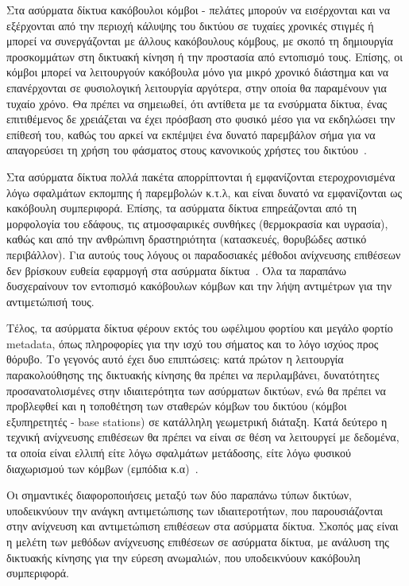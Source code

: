 \documentclass[12pt]{report}
\begin{document}
Στα ασύρματα δίκτυα κακόβουλοι κόμβοι - πελάτες μπορούν να εισέρχονται και να εξέρχονται από την περιοχή κάλυψης του δικτύου σε τυχαίες χρονικές στιγμές ή μπορεί να συνεργάζονται με άλλους κακόβουλους κόμβους, με σκοπό τη δημιουργία προσκομμάτων στη δικτυακή κίνηση ή την προστασία από εντοπισμό τους. Επίσης, οι κόμβοι μπορεί να λειτουργούν κακόβουλα μόνο για μικρό χρονικό διάστημα και να επανέρχονται σε φυσιολογική λειτουργία αργότερα, στην οποία θα παραμένουν για τυχαίο χρόνο. Θα πρέπει να σημειωθεί, ότι αντίθετα με τα ενσύρματα δίκτυα, ένας επιτιθέμενος δε χρειάζεται να έχει πρόσβαση στο φυσικό μέσο για να εκδηλώσει την επίθεσή του, καθώς του αρκεί να εκπέμψει ένα δυνατό παρεμβάλον σήμα για να απαγορεύσει τη χρήση του φάσματος στους κανονικούς χρήστες του δικτύου~\cite{paper:12}.

Στα ασύρματα δίκτυα πολλά πακέτα απορρίπτονται ή εμφανίζονται ετεροχρονισμένα λόγω σφαλμάτων εκπομπης ή παρεμβολών κ.τ.λ, και είναι δυνατό να εμφανίζονται ως κακόβουλη συμπεριφορά. Επίσης, τα ασύρματα δίκτυα επηρεάζονται από τη μορφολογία του εδάφους, τις ατμοσφαιρικές συνθήκες (θερμοκρασία και υγρασία), καθώς και από την ανθρώπινη δραστηριότητα (κατασκευές, θορυβώδες αστικό περιβάλλον). Για αυτούς τους λόγους οι παραδοσιακές μέθοδοι ανίχνευσης επιθέσεων δεν βρίσκουν ευθεία εφαρμογή στα ασύρματα δίκτυα~\cite{paper:01}. Όλα τα παραπάνω δυσχεραίνουν τον εντοπισμό κακόβουλων κόμβων και την λήψη αντιμέτρων για την αντιμετώπισή τους.

Τέλος, τα ασύρματα δίκτυα φέρουν εκτός του ωφέλιμου φορτίου και μεγάλο φορτίο \textlatin{metadata}, όπως πληροφορίες για την ισχύ του σήματος και το λόγο ισχύος προς θόρυβο. Το γεγονός αυτό έχει δυο επιπτώσεις: κατά πρώτον η λειτουργία παρακολούθησης της δικτυακής κίνησης θα πρέπει να περιλαμβάνει, δυνατότητες προσανατολισμένες στην ιδιαιτερότητα των ασύρματων δικτύων, ενώ θα πρέπει να προβλεφθεί και η τοποθέτηση των σταθερών κόμβων του δικτύου (κόμβοι εξυπηρετητές - \textlatin{base stations}) σε κατάλληλη γεωμετρική διάταξη. Κατά δεύτερο η τεχνική ανίχνευσης επιθέσεων θα πρέπει να είναι σε θέση να λειτουργεί με δεδομένα, τα οποία είναι ελλιπή είτε λόγω σφαλμάτων μετάδοσης, είτε λόγω φυσικού διαχωρισμού των κόμβων (εμπόδια κ.α)~\cite{paper:12}.

Οι σημαντικές διαφοροποιήσεις μεταξύ των δύο παραπάνω τύπων δικτύων, υποδεικνύουν την ανάγκη αντιμετώπισης των ιδιαιτεροτήτων, που παρουσιάζονται στην ανίχνευση και αντιμετώπιση επιθέσεων στα ασύρματα δίκτυα. Σκοπός μας είναι η μελέτη των μεθόδων ανίχνευσης επιθέσεων σε ασύρματα δίκτυα, με ανάλυση της δικτυακής κίνησης για την εύρεση ανωμαλιών, που υποδεικνύουν κακόβουλη συμπεριφορά.
\end{document}
